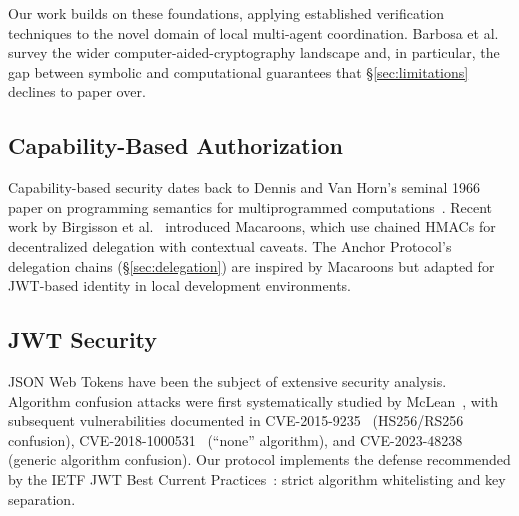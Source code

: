 \documentclass[11pt,a4paper]{article}
\theoremstyle{definition}
\begin{document}
Our work builds on these foundations, applying established verification techniques to the novel domain of local multi-agent coordination. Barbosa et al.~\cite{barbosa2021sok} survey the wider computer-aided-cryptography landscape and, in particular, the gap between symbolic and computational guarantees that \S\ref{sec:limitations} declines to paper over.

\subsection{Capability-Based Authorization}

Capability-based security dates back to Dennis and Van Horn's seminal 1966 paper on programming semantics for multiprogrammed computations~\cite{dennis1966programming}. Recent work by Birgisson et al.~\cite{birgisson2014macaroons} introduced Macaroons, which use chained HMACs for decentralized delegation with contextual caveats. The Anchor Protocol's delegation chains (\S\ref{sec:delegation}) are inspired by Macaroons but adapted for JWT-based identity in local development environments.

\subsection{JWT Security}

JSON Web Tokens have been the subject of extensive security analysis. Algorithm confusion attacks were first systematically studied by McLean~\cite{mclean2015critical}, with subsequent vulnerabilities documented in CVE-2015-9235~\cite{cve20159235} (HS256/RS256 confusion), CVE-2018-1000531~\cite{cve20181000531} (``none'' algorithm), and CVE-2023-48238~\cite{cve202348238} (generic algorithm confusion). Our protocol implements the defense recommended by the IETF JWT Best Current Practices~\cite{ietf2024jwtbcp}: strict algorithm whitelisting and key separation.
\end{document}
